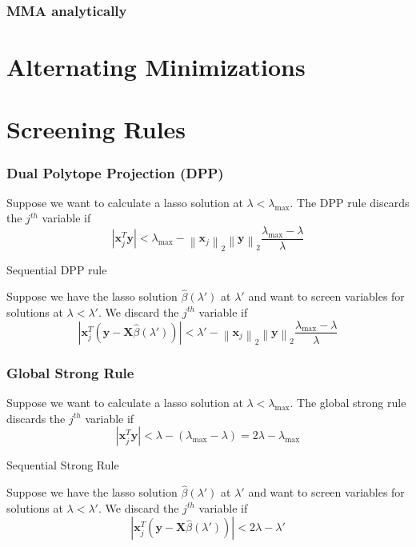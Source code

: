 \documentclass{beamer}
\newcommand{\Norm}[1]{\left\lVert#1\right\rVert}
\newcommand{\norm}[1]{\left\lvert#1\right\rvert}
\begin{document}
\begin{frame}
\frametitle{MMA analytically}

\end{frame}

\section{Alternating Minimizations}



\section{Screening Rules}

\begin{frame}
\frametitle{Dual Polytope Projection (DPP)}
Suppose we want to calculate a lasso solution at $\lambda<\lambda_{\max}$. The DPP rule discards the $j^{th}$ variable if 
\[\norm{\mathbf{x}_j^T\mathbf{y}}<\lambda_{\max}-\Norm{\mathbf{x}_j}_2\Norm{\mathbf{y}}_2\frac{\lambda_{\max}-\lambda}{\lambda}\]

\vspace{5pt}
{\hspace{5pt}\Large Sequential DPP rule}
\vspace{15pt}

Suppose we have the lasso solution $\hat\beta(\lambda')$ at $\lambda'$ and want to screen variables for solutions at $\lambda<\lambda'$. We discard the $j^{th}$ variable if 
\[\norm{\mathbf{x}_j^T(\mathbf{y}-\mathbf{X}\hat{\beta}(\lambda'))}<\lambda'-\Norm{\mathbf{x}_j}_2\Norm{\mathbf{y}}_2\frac{\lambda_{\max}-\lambda}{\lambda}\]
\end{frame}

\begin{frame}
\frametitle{Global Strong Rule}
Suppose we want to calculate a lasso solution at $\lambda<\lambda_{\max}$. The global strong rule discards the $j^{th}$ variable if 
\[\norm{\mathbf{x}_j^T\mathbf{y}}<\lambda-(\lambda_{\max}-\lambda)=2\lambda-\lambda_{\max}\]

\vspace{5pt}
{\hspace{5pt}\Large Sequential Strong Rule}
\vspace{15pt}

Suppose we have the lasso solution $\hat\beta(\lambda')$ at $\lambda'$ and want to screen variables for solutions at $\lambda<\lambda'$. We discard the $j^{th}$ variable if 
\[\norm{\mathbf{x}_j^T(\mathbf{y}-\mathbf{X}\hat{\beta}(\lambda'))}<2\lambda-\lambda'\]
\end{frame}
\end{document}
